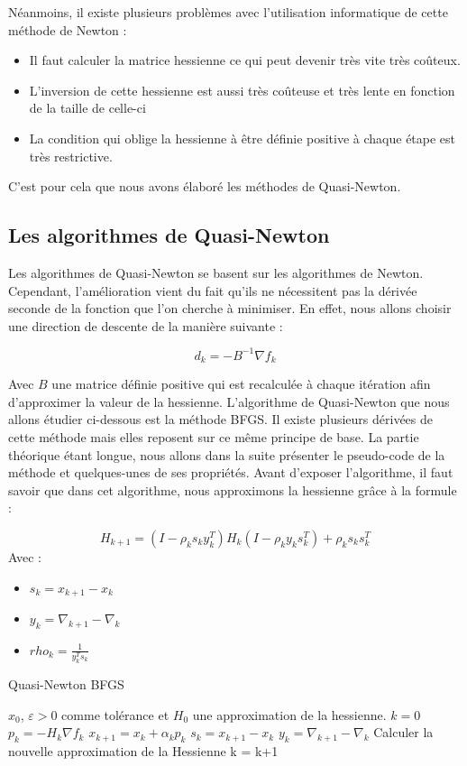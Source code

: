 Néanmoins, il existe plusieurs problèmes avec l'utilisation informatique de cette méthode de Newton : 
\begin{itemize}
	\item Il faut calculer la matrice hessienne ce qui peut devenir très vite très coûteux.
	\item L'inversion de cette hessienne est aussi très coûteuse et très lente en fonction de la taille de celle-ci
	\item La condition qui oblige la hessienne à être définie positive à chaque étape est très restrictive. 
\end{itemize}
C'est pour cela que nous avons élaboré les méthodes de Quasi-Newton.
\subsection{Les algorithmes de Quasi-Newton}
Les algorithmes de Quasi-Newton se basent sur les algorithmes de Newton. Cependant, l'amélioration vient du fait qu'ils ne nécessitent pas la dérivée seconde de la fonction que l'on cherche à minimiser. En effet, nous allons choisir une direction de descente de la manière suivante : 

\begin{equation}
d_k = -B^{-1}\nabla f_k
\end{equation}

Avec $B$ une matrice définie positive qui est recalculée à chaque itération afin d'approximer la valeur de la hessienne. L'algorithme de Quasi-Newton que nous allons étudier ci-dessous est  la méthode BFGS. Il existe plusieurs dérivées de cette méthode mais elles reposent sur ce même principe de base. La partie théorique étant longue, nous allons dans la suite présenter le pseudo-code de la méthode et quelques-unes de ses propriétés. Avant d'exposer l'algorithme, il faut savoir que dans cet algorithme, nous approximons la hessienne grâce à la formule : 

\begin{equation}
H_{k+1} = (I - \rho_ks_ky_k^T)H_k(I-\rho_ky_ks_k^T)+ \rho_ks_ks_k^T
\end{equation}
Avec : 
\begin{itemize}
	\item $s_k = x_{k+1} - x_k$
	\item $y_k = \nabla_{k+1} - \nabla_k$
	\item $rho_k = \frac{1}{y_k^T s_k}$
\end{itemize}

\begin{algorithm}[H]
	\caption{Quasi-Newton BFGS}
	\begin{algorithmic}[1]
		\Require $x_0$, $\varepsilon > 0$ comme tolérance et $H_0$ une approximation de la hessienne.
		\State  $k  =0$
		\State $p_k = -H_k\nabla f_k$
		\State $x_{k+1} = x_{k} + \alpha_k p_k$
		\State $s_k = x_{k+1} - x_k$
		\State $y_k = \nabla_{k+1} - \nabla_k$
		\State Calculer la nouvelle approximation de la Hessienne
		\State k = k+1
		\EndWhile
		
	\end{algorithmic}
\end{algorithm}


